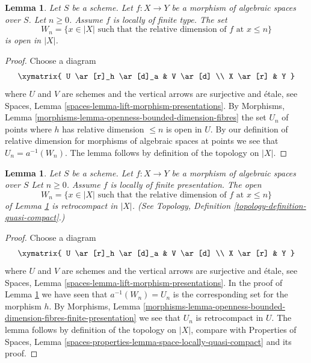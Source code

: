 \documentclass{stacks-project}
\theoremstyle{plain}
\newtheorem{lemma}[subsection]{Lemma}
\theoremstyle{definition}
\theoremstyle{remark}
\numberwithin{equation}{subsection}
\begin{document}
\begin{lemma}
\label{lemma-openness-bounded-dimension-fibres}
Let $S$ be a scheme.
Let $f : X \to Y$ be a morphism of algebraic spaces over $S$.
Let $n \geq 0$. Assume $f$ is locally of finite type.
The set
$$
W_n = \{x \in |X|
\text{ such that the relative dimension of }f\text{ at } x \leq n\}
$$
is open in $|X|$.
\end{lemma}

\begin{proof}
Choose a diagram
$$
\xymatrix{
U \ar[r]_h \ar[d]_a & V \ar[d] \\
X \ar[r] & Y
}
$$
where $U$ and $V$ are schemes and the vertical arrows are surjective and
\'etale, see
Spaces, Lemma \ref{spaces-lemma-lift-morphism-presentations}.
By
Morphisms, Lemma \ref{morphisms-lemma-openness-bounded-dimension-fibres}
the set $U_n$ of points where $h$ has relative dimension
$\leq n$ is open in $U$. By our definition of relative dimension
for morphisms of algebraic spaces at points we see that
$U_n = a^{-1}(W_n)$.
The lemma follows by definition of the topology on $|X|$.
\end{proof}

\begin{lemma}
\label{lemma-openness-bounded-dimension-fibres-finite-presentation}
Let $S$ be a scheme.
Let $f : X \to Y$ be a morphism of algebraic spaces over $S$
Let $n \geq 0$. Assume $f$ is locally of finite presentation.
The open
$$
W_n = \{x \in |X|
\text{ such that the relative dimension of }f\text{ at } x \leq n\}
$$
of Lemma \ref{lemma-openness-bounded-dimension-fibres}
is retrocompact in $|X|$. (See
Topology, Definition \ref{topology-definition-quasi-compact}.)
\end{lemma}

\begin{proof}
Choose a diagram
$$
\xymatrix{
U \ar[r]_h \ar[d]_a & V \ar[d] \\
X \ar[r] & Y
}
$$
where $U$ and $V$ are schemes and the vertical arrows are surjective and
\'etale, see
Spaces, Lemma \ref{spaces-lemma-lift-morphism-presentations}.
In the proof of
Lemma \ref{lemma-openness-bounded-dimension-fibres}
we have seen that $a^{-1}(W_n) = U_n$ is the corresponding set
for the morphism $h$. By
Morphisms, Lemma
\ref{morphisms-lemma-openness-bounded-dimension-fibres-finite-presentation}
we see that $U_n$ is retrocompact in $U$.
The lemma follows by definition of the topology on $|X|$, compare with
Properties of Spaces,
Lemma \ref{spaces-properties-lemma-space-locally-quasi-compact}
and its proof.
\end{proof}
\end{document}
